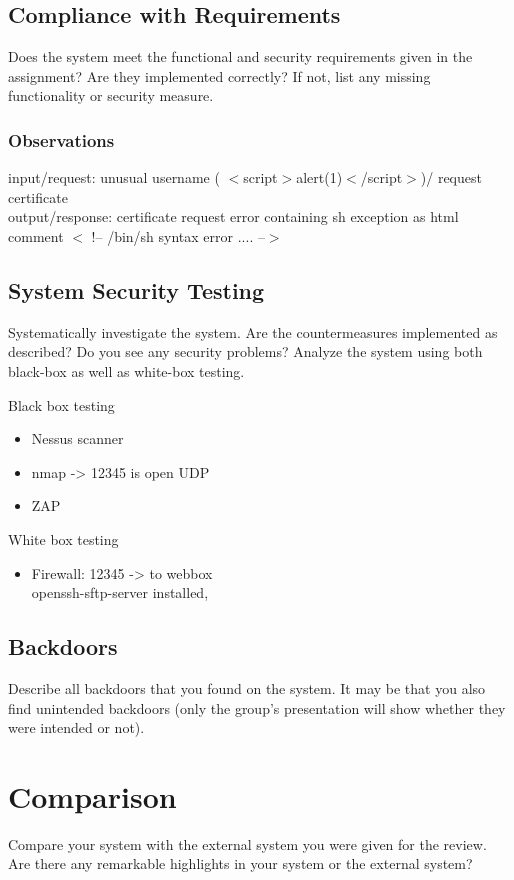 \documentclass[english]{article}
\begin{document}
\subsection{Compliance with Requirements} 

Does the system meet the functional and security requirements given in the assignment? Are they implemented correctly? If not, list any missing functionality or security measure.

\subsubsection*{Observations}
input/request: unusual username ( $<$script$>$alert(1)$<$/script$>$)/ request certificate\\
output/response:  certificate request error containing sh exception as html comment $<$ !-- /bin/sh syntax error .... --$>$


\subsection{System Security Testing}

Systematically investigate the system. Are the countermeasures implemented as described? Do you see any security problems? Analyze the system using both black-box as well as white-box testing.

Black box testing
\begin{itemize}
	\item Nessus scanner
	\item nmap -> 12345 is open UDP
	\item ZAP
\end{itemize}

White box testing

\begin{itemize}
	\item Firewall: 12345 -> to webbox\\ openssh-sftp-server installed,  
\end{itemize}


\subsection{Backdoors}

Describe all backdoors that you found on the system. It may be that you also find unintended backdoors (only the group's presentation will show whether they were intended or not).



\section{Comparison}

Compare your system with the external system you were given for the review. Are there any remarkable highlights in your system or the external system?
\end{document}
